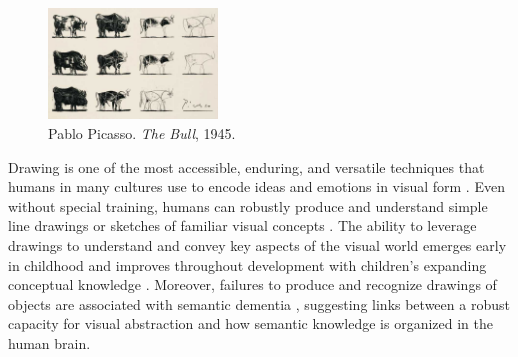\documentclass{article}
\begin{document}
\begin{figure}
    \centering
    \includegraphics[width= 0.4\textwidth]{figures/picasso_bulls.jpg}
    \caption{Pablo Picasso. \textit{The Bull}, 1945.}
    \label{fig:bulls}
\end{figure}

Drawing is one of the most accessible, enduring, and versatile techniques that humans in many cultures use to encode ideas and emotions in visual form \cite{hoffman2018dating, aubert2014pleistocene, gombrich1995story}. 
Even without special training, humans can robustly produce and understand simple line drawings or sketches of familiar visual concepts \cite{fan2018common, snodgrass1980standardized, jongejan2017quick}.
The ability to leverage drawings to understand and convey key aspects of the visual world emerges early in childhood \cite{luquet1927dessin, barrett1976symbolism, karmiloff1990constraints} and improves throughout development with children's expanding conceptual knowledge \cite{dillon2021rooms, long2021parallel, huey2022developmental}.
Moreover, failures to produce and recognize drawings of objects are associated with semantic dementia \cite{bozeat2003duck, rogers2007object}, suggesting links between a robust capacity for visual abstraction and how semantic knowledge is organized in the human brain. 
\end{document}
